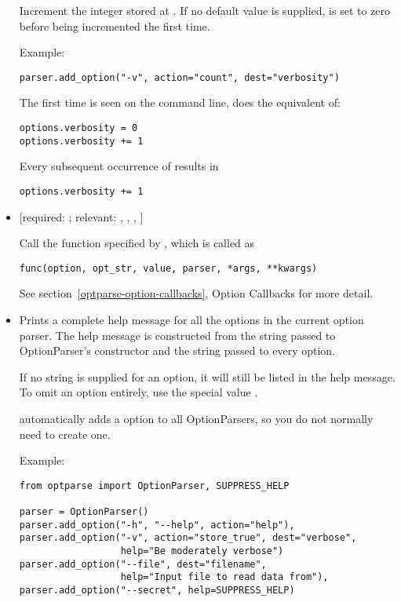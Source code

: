 \begin{itemize}
Increment the integer stored at .  If no default value is
supplied,  is set to zero before being incremented the first
time.

Example:
\begin{verbatim}
parser.add_option("-v", action="count", dest="verbosity")
\end{verbatim}

The first time  is seen on the command line,  does the
equivalent of:
\begin{verbatim}
options.verbosity = 0
options.verbosity += 1
\end{verbatim}

Every subsequent occurrence of  results in
\begin{verbatim}
options.verbosity += 1
\end{verbatim}

\item {} 
 {[}required: ;
relevant: , , , ]

Call the function specified by , which is called as
\begin{verbatim}
func(option, opt_str, value, parser, *args, **kwargs)
\end{verbatim}

See section~\ref{optparse-option-callbacks}, Option Callbacks for more detail.

\item {} 

Prints a complete help message for all the options in the
current option parser.  The help message is constructed from
the  string passed to OptionParser's constructor and
the  string passed to every option.

If no  string is supplied for an option, it will still be
listed in the help message.  To omit an option entirely, use
the special value .

 automatically adds a  option to all OptionParsers, so
you do not normally need to create one.

Example:
\begin{verbatim}
from optparse import OptionParser, SUPPRESS_HELP

parser = OptionParser()
parser.add_option("-h", "--help", action="help"),
parser.add_option("-v", action="store_true", dest="verbose",
                  help="Be moderately verbose")
parser.add_option("--file", dest="filename",
                  help="Input file to read data from"),
parser.add_option("--secret", help=SUPPRESS_HELP)
\end{verbatim}


\end{itemize}
